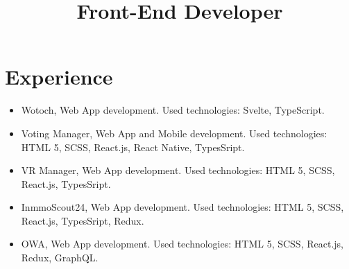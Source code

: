 \documentclass[11pt,a4paper]{moderncv}
\title{Front-End Developer}
\begin{document}
    \maketitle
    \section{Experience}

    {\begin{itemize}
         \item Wotoch, Web App development. Used technologies: Svelte, TypeScript.
         \item Voting Manager, Web App and Mobile development. Used technologies: HTML 5, SCSS, React.js, React Native, TypesSript.
         \item VR Manager, Web App development. Used technologies: HTML 5, SCSS, React.js, TypesSript.
         \item InmmoScout24, Web App development. Used technologies: HTML 5, SCSS, React.js, TypesSript, Redux.
    \end{itemize}
    }
    {\begin{itemize}
         \item OWA, Web App development. Used technologies: HTML 5, SCSS, React.js, Redux, GraphQL.
    \end{itemize}
    }
\end{document}
